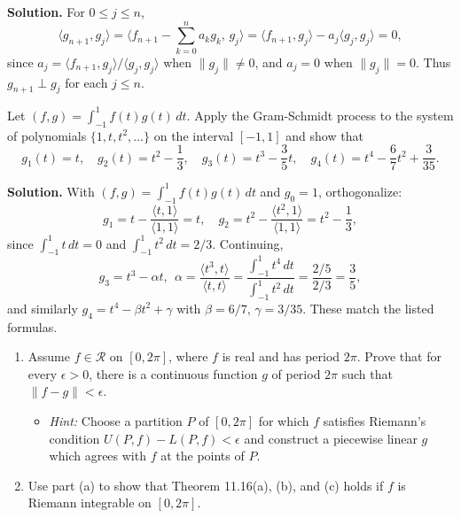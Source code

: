 \noindent\textbf{Solution.}
For $0\le j\le n$,
\[
\langle g_{n+1}, g_j\rangle = \Big\langle f_{n+1} - \sum_{k=0}^n a_k g_k,\, g_j\Big\rangle = \langle f_{n+1}, g_j\rangle - a_j\langle g_j, g_j\rangle = 0,
\]
since $a_j = \langle f_{n+1}, g_j\rangle/\langle g_j, g_j\rangle$ when $\|g_j\|\neq 0$, and $a_j=0$ when $\|g_j\|=0$. Thus $g_{n+1}\perp g_j$ for each $j\le n$.

\begin{problembox}
Let $(f, g) = \int_{-1}^1 f(t)g(t) \, dt$. Apply the Gram-Schmidt process to the system of polynomials $\{1, t, t^2, \dots\}$ on the interval $[-1, 1]$ and show that
\[
g_1(t) = t, \quad g_2(t) = t^2 - \frac{1}{3}, \quad g_3(t) = t^3 - \frac{3}{5}t, \quad g_4(t) = t^4 - \frac{6}{7}t^2 + \frac{3}{35}.
\]
\end{problembox}

\noindent\textbf{Solution.}
With $(f,g)=\int_{-1}^1 f(t)g(t)\,dt$ and $g_0=1$, orthogonalize:
\[
g_1 = t - \frac{\langle t,1\rangle}{\langle 1,1\rangle} = t,\quad
g_2 = t^2 - \frac{\langle t^2,1\rangle}{\langle 1,1\rangle} = t^2 - \frac{1}{3},
\]
since $\int_{-1}^1 t\,dt=0$ and $\int_{-1}^1 t^2\,dt=2/3$. Continuing,
\[
g_3 = t^3 - \alpha t,\ \ \alpha = \frac{\langle t^3, t\rangle}{\langle t,t\rangle} = \frac{\int_{-1}^1 t^4\,dt}{\int_{-1}^1 t^2\,dt} = \frac{2/5}{2/3} = \frac{3}{5},
\]
and similarly $g_4 = t^4 - \beta t^2 + \gamma$ with $\beta=6/7$, $\gamma=3/35$. These match the listed formulas.

\begin{problembox}
\begin{enumerate}[label=(\alph*)]
\item Assume $f \in \mathcal{R}$ on $[0, 2\pi]$, where $f$ is real and has period $2\pi$. Prove that for every $\epsilon > 0$, there is a continuous function $g$ of period $2\pi$ such that $\|f - g\| < \epsilon$.
\begin{itemize}
\item \textit{Hint:} Choose a partition $P$ of $[0, 2\pi]$ for which $f$ satisfies Riemann's condition $U(P, f) - L(P, f) < \epsilon$ and construct a piecewise linear $g$ which agrees with $f$ at the points of $P$.
\end{itemize}
\item Use part (a) to show that Theorem 11.16(a), (b), and (c) holds if $f$ is Riemann integrable on $[0, 2\pi]$.
\end{enumerate}
\end{problembox}

